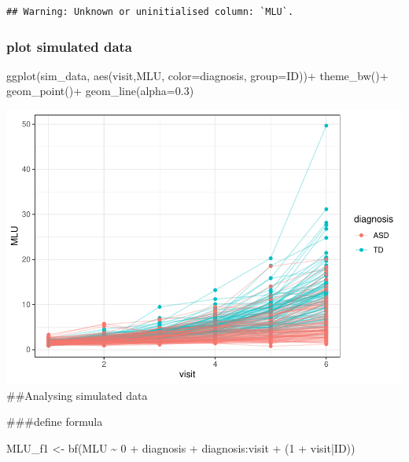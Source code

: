 \documentclass[
]{article}
\newenvironment{Shaded}{\begin{snugshade}}{\end{snugshade}}
\newcommand{\AttributeTok}[1]{\textcolor[rgb]{0.77,0.63,0.00}{#1}}
\newcommand{\DecValTok}[1]{\textcolor[rgb]{0.00,0.00,0.81}{#1}}
\newcommand{\FloatTok}[1]{\textcolor[rgb]{0.00,0.00,0.81}{#1}}
\newcommand{\FunctionTok}[1]{\textcolor[rgb]{0.00,0.00,0.00}{#1}}
\newcommand{\NormalTok}[1]{#1}
\newcommand{\OtherTok}[1]{\textcolor[rgb]{0.56,0.35,0.01}{#1}}
\newcommand{\SpecialCharTok}[1]{\textcolor[rgb]{0.00,0.00,0.00}{#1}}
\begin{document}
\begin{verbatim}
## Warning: Unknown or uninitialised column: `MLU`.
\end{verbatim}

\hypertarget{plot-simulated-data}{%
\subsubsection{plot simulated data}\label{plot-simulated-data}}

\begin{Shaded}
\begin{Highlighting}[]
\FunctionTok{ggplot}\NormalTok{(sim\_data, }\FunctionTok{aes}\NormalTok{(visit,MLU, }\AttributeTok{color=}\NormalTok{diagnosis, }\AttributeTok{group=}\NormalTok{ID))}\SpecialCharTok{+}
  \FunctionTok{theme\_bw}\NormalTok{()}\SpecialCharTok{+}
  \FunctionTok{geom\_point}\NormalTok{()}\SpecialCharTok{+}
  \FunctionTok{geom\_line}\NormalTok{(}\AttributeTok{alpha=}\FloatTok{0.3}\NormalTok{)}
\end{Highlighting}
\end{Shaded}

\includegraphics{assignment_1_final_files/figure-latex/unnamed-chunk-4-1.pdf}
\#\#Analysing simulated data

\#\#\#define formula

\begin{Shaded}
\begin{Highlighting}[]
\NormalTok{MLU\_f1 }\OtherTok{\textless{}{-}} \FunctionTok{bf}\NormalTok{(MLU }\SpecialCharTok{\textasciitilde{}} \DecValTok{0} \SpecialCharTok{+}\NormalTok{ diagnosis }\SpecialCharTok{+}\NormalTok{ diagnosis}\SpecialCharTok{:}\NormalTok{visit }\SpecialCharTok{+}\NormalTok{ (}\DecValTok{1} \SpecialCharTok{+}\NormalTok{ visit}\SpecialCharTok{|}\NormalTok{ID))}
\end{Highlighting}
\end{Shaded}
\end{document}
